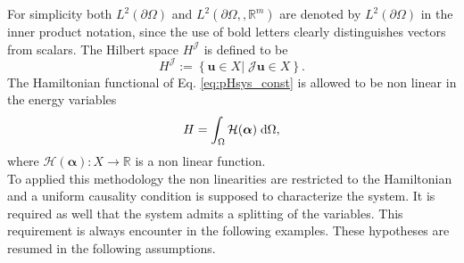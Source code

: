 For simplicity both $L^2(\partial\Omega)$ and $L^2(\partial\Omega, , \mathbb{R}^m)$ are denoted by $L^2(\partial\Omega)$ in the inner product notation, since the use of bold letters clearly distinguishes vectors from scalars.
The Hilbert space $H^\mathcal{J}$ is defined to be 
\begin{equation}
	H^\mathcal{J} :=\left\{\bm{u} \in X \vert \; \mathcal{J}\bm{u} \in X  \right\}.
\end{equation}
 The Hamiltonian functional of Eq. \eqref{eq:pHsys_const} is allowed to be non linear in the energy variables
\begin{equation*}
H = \int_\Omega \mathcal{H}(\bm{\alpha}) \d\Omega,
\end{equation*}
where $\mathcal{H}(\bm{\alpha}): X \rightarrow \mathbb{R}$ is a non linear function.
\\

To applied this methodology the non linearities are restricted to the Hamiltonian and a uniform causality condition is supposed to characterize the system. It is required as well that the system admits a splitting of the variables. This requirement is always encounter in the following examples. These hypotheses are resumed in the following assumptions.

